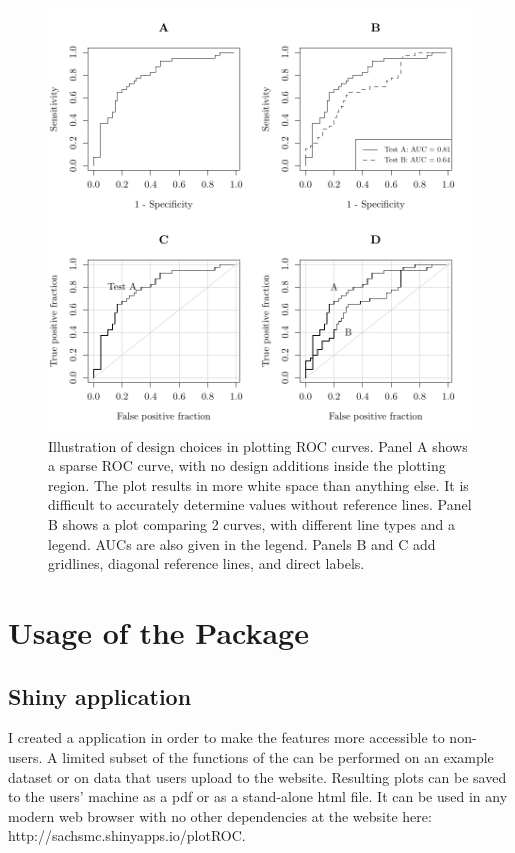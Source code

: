 \documentclass[article]{jss}
\begin{document}
\begin{figure}[htbp]
\centering
\includegraphics{figure/figure1-1.pdf}
\caption{Illustration of design choices in plotting ROC curves. Panel A
shows a sparse ROC curve, with no design additions inside the plotting
region. The plot results in more white space than anything else. It is
difficult to accurately determine values without reference lines. Panel
B shows a plot comparing 2 curves, with different line types and a
legend. AUCs are also given in the legend. Panels B and C add gridlines,
diagonal reference lines, and direct labels. \label{figure1}}
\end{figure}

\section{Usage of the Package}\label{usage-of-the-package}

\subsection{Shiny application}\label{shiny-application}

I created a  application \citep{shiny} in order to make the
features more accessible to non- users. A limited subset of
the functions of the  can be performed on an example
dataset or on data that users upload to the website. Resulting plots can
be saved to the users' machine as a pdf or as a stand-alone html file.
It can be used in any modern web browser with no other dependencies at
the website here: http://sachsmc.shinyapps.io/plotROC.
\end{document}
